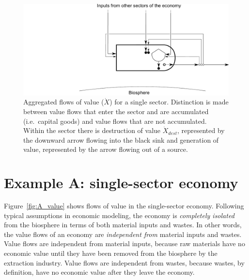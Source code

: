 \begin{figure}[!ht]
\centering
\includegraphics[width=0.8\linewidth]{Part_2/Chapter_Values/images/PERKS_basic_unit_value.pdf}
\caption[Aggregated flows of value for a single sector]{Aggregated flows of value ($\dot{X}$) 
for a single sector. 
Distinction is made between value flows that 
enter the sector and are accumulated (i.e.\ capital goods) 
and value flows that are not accumulated. 
Within the sector there is destruction of value $\dot{X}_{dest}$, 
represented by the downward arrow flowing 
into the black sink and generation of value, 
represented by the arrow flowing out of a source. }
\label{fig:basic_value_aggregated} 
\end{figure}


\section{Example A: single-sector economy} %
\label{sec:value_example_A}

Figure~\ref{fig:A_value} shows flows of value in the single-sector economy.
Following typical assumptions in economic modeling, 
the economy is \emph{completely isolated} from the biosphere
in terms of both material inputs and wastes.
In other words, the value flows of an economy are \emph{independent from}
material inputs and wastes.
Value flows are independent from material inputs,
because raw materials have no economic value 
until they have been removed from the biosphere by the extraction industry.
Value flows are independent from wastes,
because wastes, by definition, have no economic value 
after they leave the economy.

